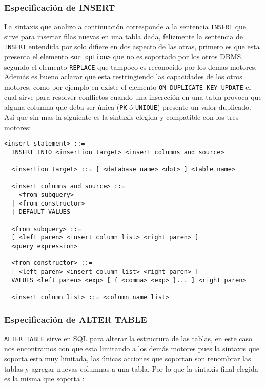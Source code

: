 \subsubsection{Especificación de INSERT} 
\label{especificacion:dialectos:insert}
La sintaxis que analizo a continuación corresponde a la sentencia \verb=INSERT= que sirve para insertar filas nuevas en una tabla dada, felizmente la sentencia de \verb=INSERT= entendida por \s solo difiere en dos aspecto de las otras, primero es que esta presenta el elemento \verb=<or option>= que no es soportado por los otros DBMS, segundo el elemento \verb=REPLACE= que tampoco es reconocido por los demas motores. Además es bueno aclarar que \s esta restringiendo las capacidades de los otros motores, como por ejemplo en \m existe el elemento \verb=ON DUPLICATE KEY UPDATE= el cual sirve para resolver conflictos cuando una insercción en una tabla provoca que alguna columna que deba ser única (\verb=PK= ó \verb=UNIQUE=) presente un valor duplicado. Así que sin mas la siguiente es la sintaxis elegida y compatible con los tres motores:

\begin{Verbatim}[frame=single, label=sintaxis para INSERT]
  <insert statement> ::=
  INSERT INTO <insertion target> <insert columns and source>

  <insertion target> ::= [ <database name> <dot> ] <table name>

  <insert columns and source> ::=
    <from subquery>
  | <from constructor>
  | DEFAULT VALUES

  <from subquery> ::=
  [ <left paren> <insert column list> <right paren> ]
  <query expression>
  
  <from constructor> ::=
  [ <left paren> <insert column list> <right paren> ]
  VALUES <left paren> <exp> [ { <comma> <exp> }... ] <right paren>

  <insert column list> ::= <column name list>
\end{Verbatim}




\subsubsection{Especificación de ALTER TABLE} 
\label{especificacion:dialectos:altertable}
\verb=ALTER TABLE= sirve en SQL para alterar la estructura de las tablas, en este caso nos encontramos con que \s esta limitando a los demás motores pues la sintaxis que soporta esta muy limitada, las únicas acciones que soportan son renombrar las tablas y agregar nuevas columnas a una tabla. Por lo que la sintaxis final elegida es la misma que soporta \s:\\

